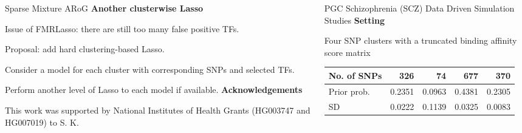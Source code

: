 \documentclass[final]{beamer}
\begin{document}
\begin{frame}{}
\begin{columns}[t]
\begin{column}{1\linewidth}
\begin{columns}
\begin{column}{.26\textwidth}
\begin{block}{Sparse Mixture ARoG}
{\color{orange!100} \textbf{Another clusterwise Lasso}}
\bi
\item Issue of FMRLasso: there are still too many false positive TFs.
\item Proposal: add hard clustering-based Lasso.
\bi
\item Consider a model for each cluster with corresponding SNPs and selected TFs.
\item Perform another level of Lasso to each model if available.
\ei
\ei
{\textbf{Acknowledgements}}\\
\centering       
{\footnotesize
\bi
\item[] This work was supported by National Institutes of Health Grants (HG003747 and HG007019) to S. K.
\ei
}
\end{block}
\end{column}

\begin{column}{.33\textwidth}

\begin{block}{PGC Schizophrenia (SCZ) Data Driven Simulation Studies} %
{\color{orange!100} \textbf{Setting}}                                                 
\centering
\bi
\item Four SNP clusters with a truncated binding affinity score matrix
 \begin{table}
{\small
 \begin{tabular}{l|rrrr}
 \hline
 No. of SNPs & 326 & 74 & 677 & 370\\
 \hline
 Prior prob. & 0.2351 & 0.0963 & 0.4381 & 0.2305\\
 \hline
SD & 0.0222 & 0.1139 & 0.0325 &0.0083\\
 \hline
\end{tabular}
}
\end{table}


\end{block}
\end{column}
\end{columns}
\end{column}
\end{columns}
\end{frame}
\end{document}
